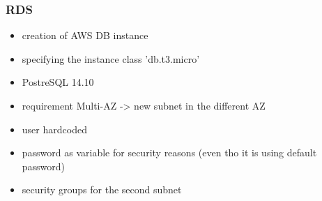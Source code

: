 \documentclass{beamer}
\begin{document}
	\begin{frame}
		\frametitle{RDS}
		\begin{itemize}
			\item creation of AWS DB instance
			\item specifying the instance class 'db.t3.micro'
			\item PostreSQL 14.10
			\item requirement Multi-AZ -> new subnet in the different AZ
			\item user hardcoded
			\item password as variable for security reasons (even tho it is using default password)
			\item security groups for the second subnet
		\end{itemize}
	\end{frame}
	
\end{document}
